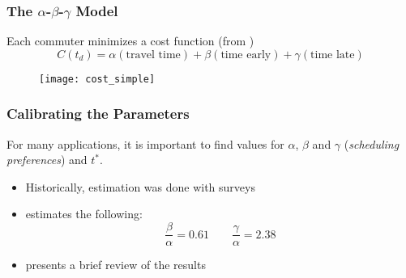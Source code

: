 \documentclass[hyperref={pdfpagelabels=false}]{beamer}
\begin{document}
\begin{frame}
  \frametitle{The \(\alpha\)-\(\beta\)-\(\gamma\) Model}
  Each commuter minimizes a cost function (from \cite{d0907f84-e14a-3d98-ad20-759f41491d6e})
  \begin{equation*}
    C(t_d) = \alpha(\text{travel time}) + \beta (\text{time early}) + \gamma (\text{time late})
  \end{equation*}
  \begin{figure}
    \centering
    \texttt{[image: cost\_simple]}
  \end{figure}
\end{frame}

\begin{frame}
  \frametitle{Calibrating the Parameters}
  For many applications, it is important to find values for \(\alpha\), \(\beta\) and \(\gamma\) (\textit{scheduling preferences}) and \(t^*\).
  \begin{itemize}
  \item Historically, estimation was done with surveys
  \item \textcite{54d203ee-4bf8-3234-9286-56e4c8b7f5bd} estimates the following:
    \begin{equation*}
      \frac{\beta}{\alpha} = 0.61\qquad \frac{\gamma}{\alpha} = 2.38
    \end{equation*}
  \item \textcite{https://doi.org/10.1111/iere.12692} presents a brief review of the results
  \end{itemize}
\end{frame}
\end{document}
